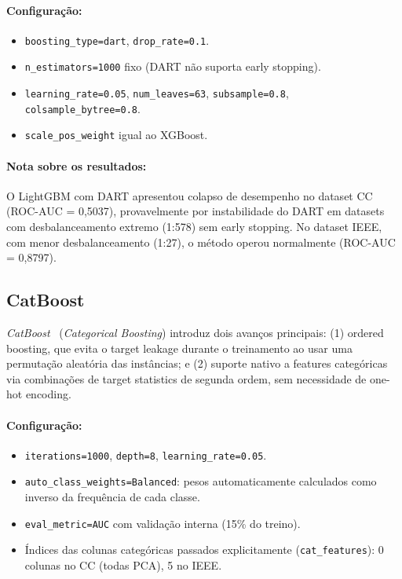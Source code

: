 \documentclass[12pt,a4paper]{article}
\newcommand{\algo}[1]{\textit{#1}}
\begin{document}
\paragraph{Configuração:}
\begin{itemize}[nosep]
  \item \texttt{boosting\_type=dart}, \texttt{drop\_rate=0.1}.
  \item \texttt{n\_estimators=1000} fixo (DART não suporta early stopping).
  \item \texttt{learning\_rate=0.05}, \texttt{num\_leaves=63},
    \texttt{subsample=0.8}, \texttt{colsample\_bytree=0.8}.
  \item \texttt{scale\_pos\_weight} igual ao XGBoost.
\end{itemize}

\paragraph{Nota sobre os resultados:} O LightGBM com DART apresentou colapso
de desempenho no dataset CC (ROC-AUC = 0{,}5037), provavelmente por
instabilidade do DART em datasets com desbalanceamento extremo (1:578) sem
early stopping. No dataset IEEE, com menor desbalanceamento (1:27), o método
operou normalmente (ROC-AUC = 0{,}8797).

\subsection{CatBoost}
\label{sec:catboost}

\algo{CatBoost}~\cite{prokhorenkova2018catboost} (\textit{Categorical Boosting})
introduz dois avanços principais: (1) ordered boosting, que evita o target
leakage durante o treinamento ao usar uma permutação aleatória das instâncias;
e (2) suporte nativo a features categóricas via combinações de target statistics
de segunda ordem, sem necessidade de one-hot encoding.

\paragraph{Configuração:}
\begin{itemize}[nosep]
  \item \texttt{iterations=1000}, \texttt{depth=8}, \texttt{learning\_rate=0.05}.
  \item \texttt{auto\_class\_weights=Balanced}: pesos automaticamente calculados
    como inverso da frequência de cada classe.
  \item \texttt{eval\_metric=AUC} com validação interna (15\% do treino).
  \item Índices das colunas categóricas passados explicitamente
    (\texttt{cat\_features}): 0 colunas no CC (todas PCA), 5 no IEEE.
\end{itemize}
\end{document}
